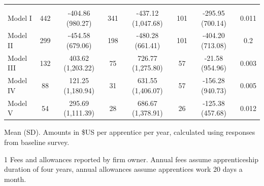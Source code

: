 \documentclass[
  11pt,
a4paper
]{article}
\begin{document}
\begin{table}[H]
{\begin{threeparttable}
\begin{tabular}[t]{lccccccc}
\addlinespace[0.3em]
\multicolumn{8}{l}{\textbf{Net Benefits}}\\
\hspace{1em}Model I & 442 & -404.86 (980.27) & 341 & -437.12 (1,047.68) & 101 & -295.95 (700.14) & 0.011\\
\hspace{1em}Model II & 299 & -454.58 (679.06) & 198 & -480.28 (661.41) & 101 & -404.20 (713.08) & 0.2\\
\hspace{1em}Model III & 132 & 403.62 (1,203.22) & 75 & 726.77 (1,275.80) & 57 & -21.58 (954.96) & 0.003\\
\hspace{1em}Model IV & 88 & 121.25 (1,180.94) & 31 & 631.55 (1,406.07) & 57 & -156.28 (940.73) & 0.005\\
\hspace{1em}Model V & 54 & 295.69 (1,111.39) & 28 & 686.67 (1,378.91) & 26 & -125.38 (457.68) & 0.012\\
\bottomrule
\end{tabular}
\begin{tablenotes}
\small
\item Mean (SD). Amounts in \$US per apprentice per year, calculated using responses from baseline survey.
\item[1] Fees and allowances reported by firm owner. Annual fees assume apprenticeship duration of four years, annual allowances assume apprentices work 20 days a month.
\end{tablenotes}
\end{threeparttable}}
\end{table}
\end{document}
